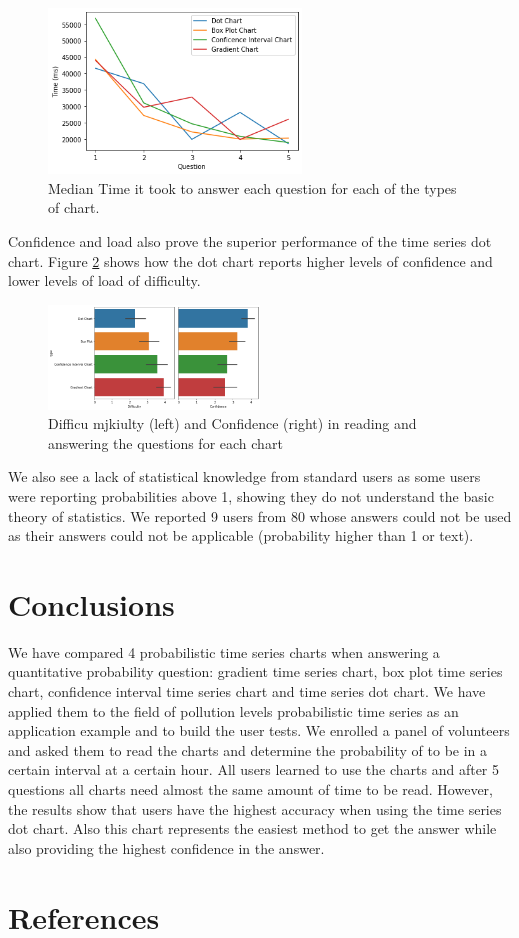 \documentclass[a4paper,3p,sort&compress]{elsarticle}
\begin{document}
\begin{figure}
  \centering
   \includegraphics[width=0.6\textwidth]{duration_evo}
  \caption{\label{figure:duration} Median Time it took to answer each question for each of the types of chart.}
\end{figure}  

Confidence and load also prove the superior performance of the time series dot chart. 
Figure \ref{figure:confi_load} shows how the dot chart reports higher levels of confidence and 
lower levels of load of difficulty.

\begin{figure}
  \centering
   \includegraphics[width=0.5\textwidth]{confi_load}
  \caption{\label{figure:confi_load} Difficu mjkiulty (left) and Confidence (right) in reading and answering the questions for each chart}
\end{figure}

We also see a lack of statistical knowledge from standard users as some users were reporting 
probabilities above 1, showing they do not understand the basic theory of statistics. 
We reported 9 users from 80 whose answers could not be used as their answers could not be 
applicable (probability higher than 1 or text).

\section{Conclusions}
\label{sec:concl}

We have compared 4 probabilistic time 
series charts when answering a quantitative probability question: 
gradient time series chart, box plot time series chart, confidence interval 
time series chart and time series dot chart.
We have applied them to the field of \no pollution levels probabilistic 
time series as an application example and to build the user tests.
We enrolled a panel of volunteers and asked them to read the charts 
and determine the probability of \no to be in a certain interval at a certain 
hour.
All users learned to use the charts and after 5 questions all charts 
need almost the same amount 
of time to be read.
However, the results show that users have the highest accuracy when using 
the time series dot chart. Also this chart represents the easiest method 
to get the answer while also providing the highest confidence in the answer.


\section{References}
\label{sec:ref}



\end{document}
